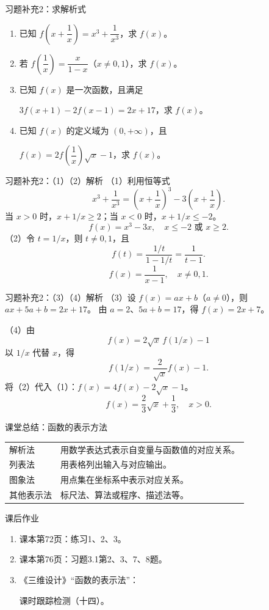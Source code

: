 \begin{frame}[t]{习题补充2：求解析式}
\small
\begin{enumerate}
\setlength{\itemsep}{5mm}
\item 已知 $f\left(x+\dfrac1x\right)=x^3+\dfrac1{x^3}$，求 $f(x)$。
\item 若 $f\left(\dfrac1x\right)=\dfrac{x}{1-x}$（$x\ne0,1$），求 $f(x)$。
\item 已知 $f(x)$ 是一次函数，且满足\par
$3f(x+1)-2f(x-1)=2x+17$，求 $f(x)$。
\item 已知 $f(x)$ 的定义域为 $(0,+\infty)$，且\par
$f(x)=2f\left(\dfrac1x\right)\sqrt{x}-1$，求 $f(x)$。
\end{enumerate}
\end{frame}
\begin{frame}[t]{习题补充2：（1）（2）解析}
\small
（1）利用恒等式
\[x^3+\frac1{x^3}=\left(x+\frac1x\right)^3-3\left(x+\frac1x\right).\]
当 $x>0$ 时，$x+1/x\ge2$；当 $x<0$ 时，$x+1/x\le-2$。
\[\boxed{f(x)=x^3-3x,\quad x\le-2\text{ 或 }x\ge2.}\]
\vspace{3mm}
（2）令 $t=1/x$，则 $t\ne0,1$，且
\[f(t)=\frac{1/t}{1-1/t}=\frac1{t-1}.\]
\[\boxed{f(x)=\frac1{x-1},\quad x\ne0,1.}\]
\end{frame}
\begin{frame}[t]{习题补充2：（3）（4）解析}
\small
（3）设 $f(x)=ax+b$（$a\ne0$），则 $ax+5a+b=2x+17$。
由 $a=2$、$5a+b=17$，得 $\boxed{f(x)=2x+7}$。
\medskip\par
（4）由
\[f(x)=2\sqrt{x}\,f(1/x)-1\tag{1}\]
以 $1/x$ 代替 $x$，得
\[f(1/x)=\frac{2}{\sqrt{x}}f(x)-1.\tag{2}\]
将（2）代入（1）：$f(x)=4f(x)-2\sqrt{x}-1$。
\[\boxed{f(x)=\frac23\sqrt{x}+\frac13,\quad x>0.}\]
\end{frame}
\begin{frame}[t]{课堂总结：函数的表示方法}
\renewcommand{\arraystretch}{1.7}
\begin{tabular}{p{26mm}p{105mm}}\toprule
解析法&用数学表达式表示自变量与函数值的对应关系。\\
列表法&用表格列出输入与对应输出。\\
图象法&用点集在坐标系中表示对应关系。\\
其他表示法&标尺法、算法或程序、描述法等。\\\bottomrule
\end{tabular}
\vspace{4mm}
\end{frame}
\begin{frame}[t]{课后作业}
\begin{enumerate}
\setlength{\itemsep}{7mm}
\item 课本第72页：练习1、2、3。
\item 课本第76页：习题3.1第2、3、7、8题。
\item 《三维设计》“函数的表示法”：\par 课时跟踪检测（十四）。
\end{enumerate}
\end{frame}
\campusclosing[本课结束]
